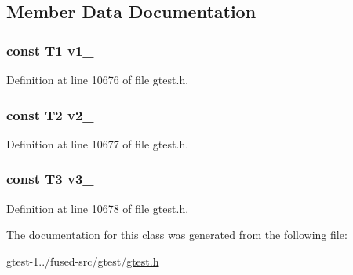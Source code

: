 \subsection{\-Member \-Data \-Documentation}
\hypertarget{classtesting_1_1internal_1_1ValueArray3_aac1d0654cc6c1aceb4a5d0fa7a98042e}{
\subsubsection[{v1\-\_\-}]{\setlength{\rightskip}{0pt plus 5cm}const \-T1 {\bf v1\-\_\-}}}\label{d4/dfe/classtesting_1_1internal_1_1ValueArray3_aac1d0654cc6c1aceb4a5d0fa7a98042e}


\-Definition at line 10676 of file gtest.\-h.

\hypertarget{classtesting_1_1internal_1_1ValueArray3_a9f0a8ce6ce2fd27e980c4c51a7a7256a}{
\subsubsection[{v2\-\_\-}]{\setlength{\rightskip}{0pt plus 5cm}const \-T2 {\bf v2\-\_\-}}}\label{d4/dfe/classtesting_1_1internal_1_1ValueArray3_a9f0a8ce6ce2fd27e980c4c51a7a7256a}


\-Definition at line 10677 of file gtest.\-h.

\hypertarget{classtesting_1_1internal_1_1ValueArray3_a4f8257321a2eab0456239174d6712d5e}{
\subsubsection[{v3\-\_\-}]{\setlength{\rightskip}{0pt plus 5cm}const \-T3 {\bf v3\-\_\-}}}\label{d4/dfe/classtesting_1_1internal_1_1ValueArray3_a4f8257321a2eab0456239174d6712d5e}


\-Definition at line 10678 of file gtest.\-h.



\-The documentation for this class was generated from the following file\-:\begin{DoxyCompactItemize}
\item 
gtest-\/1../fused-\/src/gtest/\hyperlink{fused-src_2gtest_2gtest_8h}{gtest.\-h}\end{DoxyCompactItemize}
